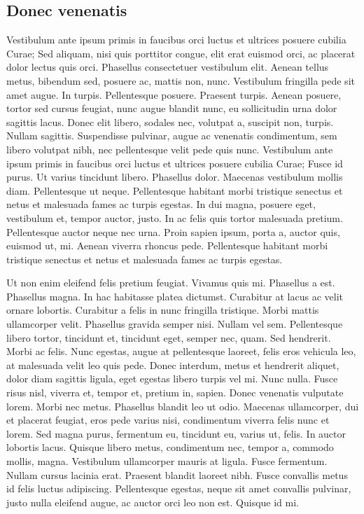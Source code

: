 \documentclass[a4paper,11pt]{scrartcl}
\begin{document}
\subsection{Donec venenatis}
Vestibulum ante ipsum primis in faucibus orci luctus et ultrices posuere cubilia Curae; Sed aliquam, nisi quis porttitor congue, elit erat euismod orci, ac placerat dolor lectus quis orci. Phasellus consectetuer vestibulum elit. Aenean tellus metus, bibendum sed, posuere ac, mattis non, nunc. Vestibulum fringilla pede sit amet augue. In turpis. Pellentesque posuere. Praesent turpis. Aenean posuere, tortor sed cursus feugiat, nunc augue blandit nunc, eu sollicitudin urna dolor sagittis lacus. Donec elit libero, sodales nec, volutpat a, suscipit non, turpis. Nullam sagittis. Suspendisse pulvinar, augue ac venenatis condimentum, sem libero volutpat nibh, nec pellentesque velit pede quis nunc. Vestibulum ante ipsum primis in faucibus orci luctus et ultrices posuere cubilia Curae; Fusce id purus. Ut varius tincidunt libero. Phasellus dolor. Maecenas vestibulum mollis diam. Pellentesque ut neque. Pellentesque habitant morbi tristique senectus et netus et malesuada fames ac turpis egestas. In dui magna, posuere eget, vestibulum et, tempor auctor, justo. In ac felis quis tortor malesuada pretium. Pellentesque auctor neque nec urna. Proin sapien ipsum, porta a, auctor quis, euismod ut, mi. Aenean viverra rhoncus pede. Pellentesque habitant morbi tristique senectus et netus et malesuada fames ac turpis egestas.

 Ut non enim eleifend felis pretium feugiat. Vivamus quis mi. Phasellus a est. Phasellus magna. In hac habitasse platea dictumst. Curabitur at lacus ac velit ornare lobortis. Curabitur a felis in nunc fringilla tristique. Morbi mattis ullamcorper velit. Phasellus gravida semper nisi. Nullam vel sem. Pellentesque libero tortor, tincidunt et, tincidunt eget, semper nec, quam. Sed hendrerit. Morbi ac felis. Nunc egestas, augue at pellentesque laoreet, felis eros vehicula leo, at malesuada velit leo quis pede. Donec interdum, metus et hendrerit aliquet, dolor diam sagittis ligula, eget egestas libero turpis vel mi. Nunc nulla. Fusce risus nisl, viverra et, tempor et, pretium in, sapien. Donec venenatis vulputate lorem. Morbi nec metus. Phasellus blandit leo ut odio. Maecenas ullamcorper, dui et placerat feugiat, eros pede varius nisi, condimentum viverra felis nunc et lorem. Sed magna purus, fermentum eu, tincidunt eu, varius ut, felis. In auctor lobortis lacus. Quisque libero metus, condimentum nec, tempor a, commodo mollis, magna. Vestibulum ullamcorper mauris at ligula. Fusce fermentum. Nullam cursus lacinia erat. Praesent blandit laoreet nibh. Fusce convallis metus id felis luctus adipiscing. Pellentesque egestas, neque sit amet convallis pulvinar, justo nulla eleifend augue, ac auctor orci leo non est. Quisque id mi.
 
\end{document}
